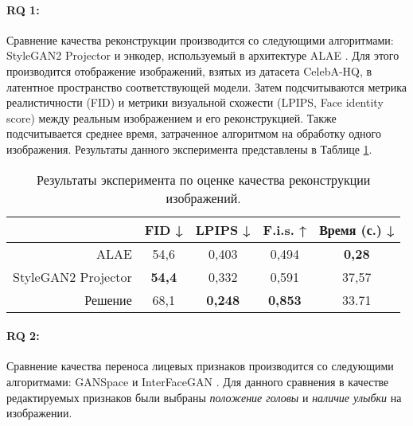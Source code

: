 \paragraph{RQ 1:}
Сравнение качества реконструкции производится со следующими алгоритмами: StyleGAN2 Projector \cite{karras2020stylegan2} и энкодер, используемый в архитектуре ALAE \cite{ALAE}.
Для этого производится отображение изображений, взятых из датасета CelebA-HQ, в латентное пространство соответствующей модели.
Затем подсчитываются метрика реалистичности (FID) и метрики визуальной схожести (LPIPS, Face identity score) между реальным изображением и его реконструкцией.
Также подсчитывается среднее время, затраченное алгоритмом на обработку одного изображения.
Результаты данного эксперимента представлены в Таблице \ref{tab:exp1}.

\begin{table}
\begin{center}
  \caption{Результаты эксперимента по оценке качества реконструкции изображений.}
  \label{tab:exp1}
  \begin{tabular}{ |r|c|c|c|c| } 
    \hline
      & FID ↓ & LPIPS ↓ & F.i.s. ↑ & Время (с.) ↓ \\ 
    \hline\hline
    ALAE    & 54,6 & 0,403 & 0,494 & \textbf{0,28}  \\ 
    StyleGAN2 Projector 
            & \textbf{54,4} & 0,332 & 0,591 & 37,57  \\ 
    Решение & 68,1 & \textbf{0,248} & \textbf{0,853} & 33.71 \\ 
    \hline
  \end{tabular}
\end{center}
\end{table}

\paragraph{RQ 2:}
Сравнение качества переноса лицевых признаков производится со следующими алгоритмами: GANSpace \cite{hrknen2020ganspace} и InterFaceGAN \cite{shen2020interfacegan}.
Для данного сравнения в качестве редактируемых признаков были выбраны \emph{положение головы} и \emph{наличие улыбки} на изображении.

